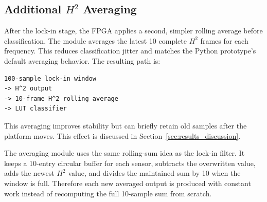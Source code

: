 \subsection{Additional \texorpdfstring{$H^2$}{H2} Averaging}

After the lock-in stage, the FPGA applies a second, simpler rolling average before classification. The module  averages the latest 10 complete $H^2$ frames for each frequency. This reduces classification jitter and matches the Python prototype's default averaging behavior. The resulting path is:

\begin{lstlisting}
100-sample lock-in window
-> H^2 output
-> 10-frame H^2 rolling average
-> LUT classifier
\end{lstlisting}

This averaging improves stability but can briefly retain old samples after the platform moves. This effect is discussed in Section~\ref{sec:results_discussion}.

The averaging module uses the same rolling-sum idea as the lock-in filter. It keeps a 10-entry circular buffer for each sensor, subtracts the overwritten value, adds the newest $H^2$ value, and divides the maintained sum by 10 when the window is full. Therefore each new averaged output is produced with constant work instead of recomputing the full 10-sample sum from scratch.
